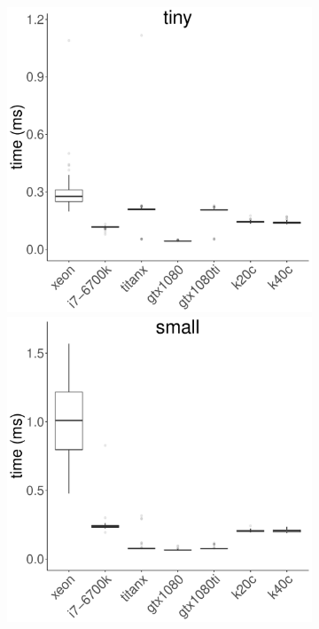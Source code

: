 \documentclass[../document.tex]{subfiles}
\begin{document}
\begin{figure}
	\begin{subfigure}{0.09\textwidth} \label{fig:time-fft} \vspace{5mm}\end{subfigure}
	\begin{subfigure}{0.9\textwidth}
		\includegraphics[width=\plotwidth]{figures/time-results/generate_fft_tiny_boxplot-1}
		\includegraphics[width=\plotwidth]{figures/time-results/generate_fft_small_boxplot-1}

\end{subfigure}
\end{figure}
\end{document}
